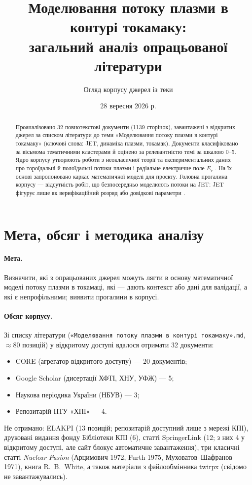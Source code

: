 \documentclass[11pt,a4paper]{article}
\title{Моделювання потоку плазми в контурі токамаку:\\
       загальний аналіз опрацьованої літератури}
\author{Огляд корпусу джерел із теки \file{library}}
\date{28 вересня 2026 р.}
\newcommand{\file}[1]{\texttt{\small #1}}
\begin{document}
\maketitle

\begin{abstract}
Проаналізовано 32 повнотекстові документи (1139 сторінок), завантажені з відкритих
джерел за списком літератури до теми «Моделювання потоку плазми в контурі токамаку»
(ключові слова: JET, динаміка плазми, токамак). Документи класифіковано за вісьмома
тематичними кластерами й оцінено за релевантністю темі за шкалою 0–5. Ядро корпусу
утворюють роботи з неокласичної теорії та експериментальних даних про тороїдальні й
полоїдальні потоки плазми і радіальне електричне поле $E_r$
\cite{Singh2004,Sigmar1987,Seto2014,Ida2001}. На їх основі запропоновано каркас
математичної моделі для проєкту. Головна прогалина корпусу --- відсутність робіт,
що безпосередньо моделюють потоки на JET: JET фігурує лише як верифікаційний розряд
або довідкові параметри \cite{Hoppe2022,Tyshchenko2021,vanVugt2019}.
\end{abstract}

\tableofcontents

\section{Мета, обсяг і методика аналізу}

\paragraph{Мета.} Визначити, які з опрацьованих джерел можуть лягти в основу
математичної моделі потоку плазми в токамаці, які --- дають контекст або дані для
валідації, а які є непрофільними; виявити прогалини в корпусі.

\paragraph{Обсяг корпусу.} Зі списку літератури (\file{«Моделювання потоку плазми в
контурі токамаку».md}, $\approx 80$ позицій) у відкритому доступі вдалося отримати
32 документи:
\begin{itemize}
  \item CORE (агрегатор відкритого доступу) --- 20 документів;
  \item Google Scholar (дисертації ХФТІ, ХНУ, УФЖ) --- 5;
  \item Наукова періодика України (НБУВ) --- 3;
  \item Репозитарій НТУ «ХПІ» --- 4.
\end{itemize}
Не отримано: ELAKPI (13 позицій; репозитарій доступний лише з мережі КПІ), друковані
видання фонду Бібліотеки КПІ (6), статті SpringerLink (12; з них 4 у відкритому
доступі, але сайт блокує автоматичне завантаження), три класичні статті
\emph{Nuclear Fusion} (Арцимович 1972, Furth 1975, Муховатов--Шафранов 1971), книга
R.~B.~White, а також матеріали з файлообмінника twirpx (свідомо не завантажувались).
\end{document}
